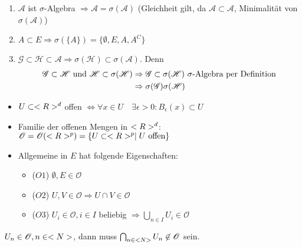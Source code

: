 \begin{remark}
	\begin{enumerate}[label=(\alph*)]
		\item $\mathscr{A}$ ist $\sigma$-Algebra $\Rightarrow \mathscr{A} = \sigma(\mathscr{A})$ (Gleichheit gilt, da $\mathscr{A} \subset \mathscr{A}$, Minimalität von $\sigma(\mathscr{A})$)
		\item $A \subset E \Rightarrow \sigma(\{A\}) = \{\emptyset, E, A, A^C\}$
		\item $\mathscr{G} \subset \mathscr{H} \subset \mathscr{A} \Rightarrow \sigma(\mathscr{H}) \subset \sigma(\mathscr{A})$. Denn
		\begin{align}
		\mathscr{G} \subset \mathscr{H} \text{ und } \mathscr{H} \subset \sigma(\mathscr{H}) &\Rightarrow \mathscr{G} \subset \sigma(\mathscr{H}) \text{ $\sigma$-Algebra per Definition}\notag \\
		&\Rightarrow \sigma(\mathscr{G})\sigma(\mathscr{H}) \notag
		\end{align}
	\end{enumerate}
\end{remark}

\begin{repetition}
	\begin{itemize}
		\item $U \subset <R>^{d}$ offen $\Leftrightarrow \forall x \in U \quad \exists \epsilon > 0 \colon B_{\epsilon}(x) \subset U$
		\item Familie der offenen Mengen in $<R>^d$: $\mathscr{O}  = \mathscr{O}(<R>^p) = \{ U \subset <R>^p \mid U \text{ offen}\}$
		\item Allgemeine  in $E$ hat folgende Eigenschaften:
		\begin{itemize}
			\item ($O1$) $\emptyset, E \in \mathscr{O}$
			\item ($O2$) $U,V \in \mathscr{O} \Rightarrow U \cap V \in \mathscr{O}$
			\item ($O3$) $U_i \in \mathscr{O}, i \in I$ beliebig $\Rightarrow \bigcup_{n\in I} U_i \in \mathscr{O}$
		\end{itemize}
	\end{itemize}
\end{repetition}

\begin{hint}
	$U_n \in \mathscr{O}, n \in <N>$, dann muss $\bigcap_{n\in <N>} U_n \not \in \mathscr{O}$ sein.
\end{hint}

